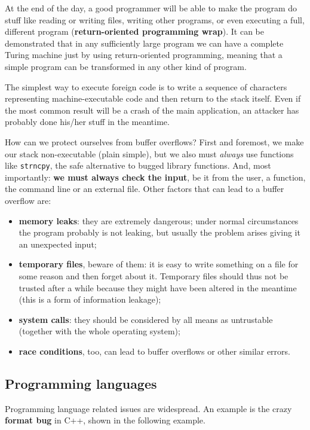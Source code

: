 At the end of the day, a good programmer will be able to make the program do stuff like reading or writing files, writing other programs, or even executing a full, different program (\textbf{return-oriented programming wrap}). It can be demonstrated that in any sufficiently large program we can have a complete Turing machine just by using return-oriented programming, meaning that a simple program can be transformed in any other kind of program.
 
The simplest way to execute foreign code is to write a sequence of characters representing machine-executable code and then return to the stack itself. Even if the most common result will be a crash of the main application, an attacker has probably done his/her stuff in the meantime.
 
How can we protect ourselves from buffer overflows? First and foremost, we make our stack non-executable (plain simple), but we also must \textit{always} use functions like \texttt{strncpy}, the safe alternative to bugged library functions. And, most importantly: \textbf{we must always check the input}, be it from the user, a function, the command line or an external file. Other factors that can lead to a buffer overflow are:

\begin{itemize}
    \item \textbf{memory leaks}: they are extremely dangerous; under normal circumstances the program probably is not leaking, but usually the problem arises giving it an unexpected input;
    \item \textbf{temporary files}, beware of them: it is easy to write something on a file for some reason and then forget about it. Temporary files should thus not be trusted after a while because they might have been altered in the meantime (this is a form of information leakage);
    \item \textbf{system calls}: they should be considered by all means as untrustable (together with the whole operating system);
    \item \textbf{race conditions}, too, can lead to buffer overflows or other similar errors.
\end{itemize}

\subsection{Programming languages}
Programming language related issues are widespread. An example is the crazy \textbf{format bug} in C++, shown in the following example.

